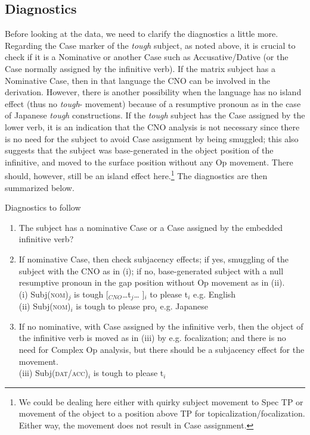 \documentclass[output=paper,colorlinks,citecolor=brown,
]{langscibook}
\begin{document}
\subsection{Diagnostics} \label{s3.1ha}
Before looking at the data, we need to clarify the diagnostics a little more. Regarding the Case marker of the \textit{tough} subject, as noted above, it is crucial to check if it is a Nominative or another Case such as Accusative/Dative (or the Case normally assigned by the infinitive verb). If the matrix subject has a Nominative Case, then in that language the CNO can be involved in the derivation. However, there is another possibility when the language has no island effect (thus no \textit{tough}- movement) because of a resumptive pronoun as in the case of Japanese \textit{tough} constructions. If the \textit{tough} subject has the Case assigned by the lower verb, it is an indication that the CNO analysis is not necessary since there is no need for the subject to avoid Case assignment by being smuggled; this also suggests that the subject was base-generated in the object position of the infinitive, and moved to the surface position without any Op movement. There should, however, still be an island effect here.\footnote{We could be dealing here either with quirky subject movement to Spec TP or movement of the object to a position above TP for topicalization/focalization. Either way, the movement does not result in Case assignment.} The diagnostics are then summarized below.

\begin{exe}
\ex \label{16ha}
Diagnostics to follow
\begin{enumerate}
    \item The subject has a nominative Case or a Case assigned by the embedded infinitive verb?
    \item If nominative Case, then check subjacency effects; if yes, smuggling of the subject with the CNO as in (i); if no, base-generated subject with a null resumptive pronoun in the gap position without Op movement as in (ii).\\
    (i) Subj(\textsc{nom})$_{j}$ is tough [$_{CNO}$…t$_{j}$… ]$_{i}$ to please t$_{i}$ \hfill  e.g. English\\
    (ii) Subj(\textsc{nom})$_{i}$ is tough to please pro$_{i}$ \hfill e.g. Japanese
    \item If no nominative, with Case assigned by the infinitive verb, then the object of the infinitive verb is moved as in (iii) by e.g. focalization; and there is no need for Complex Op analysis, but there should be a subjacency effect for the movement.\\
    (iii) Subj(\textsc{dat/acc})$_{i}$ is tough to please t$_{i}$                        
\end{enumerate}
\end{exe}
\end{document}
